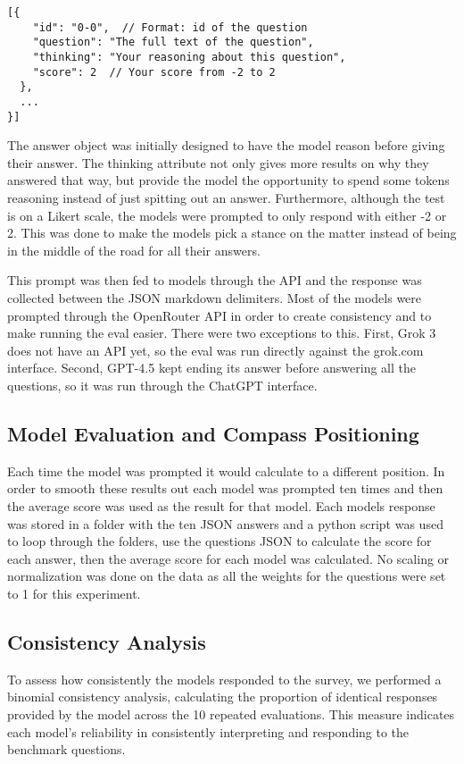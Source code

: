 \begin{verbatim}
[{
    "id": "0-0",  // Format: id of the question
    "question": "The full text of the question",
    "thinking": "Your reasoning about this question",
    "score": 2  // Your score from -2 to 2
  },
  ...
}]
\end{verbatim}

The answer object was initially designed to have the model reason before giving their answer. The thinking attribute not only gives more results on why they answered that way, but provide the model the opportunity to spend some tokens reasoning instead of just spitting out an answer. Furthermore, although the test is on a Likert scale, the models were prompted to only respond with either -2 or 2. This was done to make the models pick a stance on the matter instead of being in the middle of the road for all their answers.

This prompt was then fed to models through the API and the response was collected between the JSON markdown delimiters. Most of the models were prompted through the OpenRouter API in order to create consistency and to make running the eval easier. There were two exceptions to this. First, Grok 3 does not have an API yet, so the eval was run directly against the grok.com interface. Second, GPT-4.5 kept ending its answer before answering all the questions, so it was run through the ChatGPT interface.

\subsection{Model Evaluation and Compass Positioning}
Each time the model was prompted it would calculate to a different position. In order to smooth these results out each model was prompted ten times and then the average score was used as the result for that model. Each models response was stored in a folder with the ten JSON answers and a python script was used to loop through the folders, use the questions JSON to calculate the score for each answer, then the average score for each model was calculated. No scaling or normalization was done on the data as all the weights for the questions were set to 1 for this experiment.

\subsection{Consistency Analysis}
To assess how consistently the models responded to the survey, we performed a binomial consistency analysis, calculating the proportion of identical responses provided by the model across the 10 repeated evaluations. This measure indicates each model's reliability in consistently interpreting and responding to the benchmark questions.


